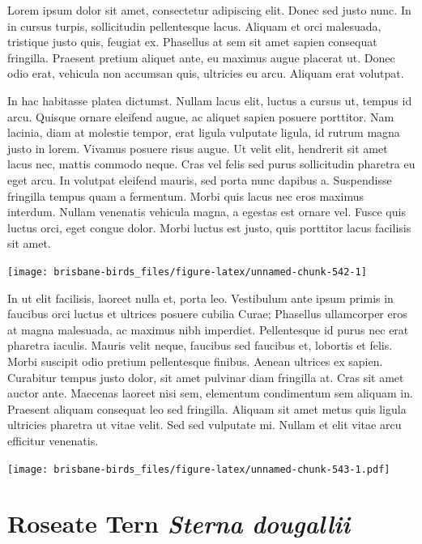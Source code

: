 \documentclass[]{book}
\let\origfigure\figure
\let\endorigfigure\endfigure
\renewenvironment{figure}[1][2] {
  \expandafter\origfigure\expandafter[H]
} {
  \endorigfigure
}
\begin{document}
Lorem ipsum dolor sit amet, consectetur adipiscing elit. Donec sed justo
nunc. In in cursus turpis, sollicitudin pellentesque lacus. Aliquam et
orci malesuada, tristique justo quis, feugiat ex. Phasellus at sem sit
amet sapien consequat fringilla. Praesent pretium aliquet ante, eu
maximus augue placerat ut. Donec odio erat, vehicula non accumsan quis,
ultricies eu arcu. Aliquam erat volutpat.

In hac habitasse platea dictumst. Nullam lacus elit, luctus a cursus ut,
tempus id arcu. Quisque ornare eleifend augue, ac aliquet sapien posuere
porttitor. Nam lacinia, diam at molestie tempor, erat ligula vulputate
ligula, id rutrum magna justo in lorem. Vivamus posuere risus augue. Ut
velit elit, hendrerit sit amet lacus nec, mattis commodo neque. Cras vel
felis sed purus sollicitudin pharetra eu eget arcu. In volutpat eleifend
mauris, sed porta nunc dapibus a. Suspendisse fringilla tempus quam a
fermentum. Morbi quis lacus nec eros maximus interdum. Nullam venenatis
vehicula magna, a egestas est ornare vel. Fusce quis luctus orci, eget
congue dolor. Morbi luctus est justo, quis porttitor lacus facilisis sit
amet.

\begin{figure}
\texttt{[image: brisbane-birds\_files/figure-latex/unnamed-chunk-542-1]} \caption{insert figure caption}\label{fig:unnamed-chunk-542}
\end{figure}

In ut elit facilisis, laoreet nulla et, porta leo. Vestibulum ante ipsum
primis in faucibus orci luctus et ultrices posuere cubilia Curae;
Phasellus ullamcorper eros at magna malesuada, ac maximus nibh
imperdiet. Pellentesque id purus nec erat pharetra iaculis. Mauris velit
neque, faucibus sed faucibus et, lobortis et felis. Morbi suscipit odio
pretium pellentesque finibus. Aenean ultrices ex sapien. Curabitur
tempus justo dolor, sit amet pulvinar diam fringilla at. Cras sit amet
auctor ante. Maecenas laoreet nisi sem, elementum condimentum sem
aliquam in. Praesent aliquam consequat leo sed fringilla. Aliquam sit
amet metus quis ligula ultricies pharetra ut vitae velit. Sed sed
vulputate mi. Nullam et elit vitae arcu efficitur venenatis.

\begin{figure}
\centering
\texttt{[image: brisbane-birds\_files/figure-latex/unnamed-chunk-543-1.pdf]}
\caption{\label{fig:unnamed-chunk-543}insert figure caption}
\end{figure}

\section{\texorpdfstring{Roseate Tern \emph{Sterna
dougallii}}{Roseate Tern Sterna dougallii}}\label{roseate-tern-sterna-dougallii}
\end{document}
